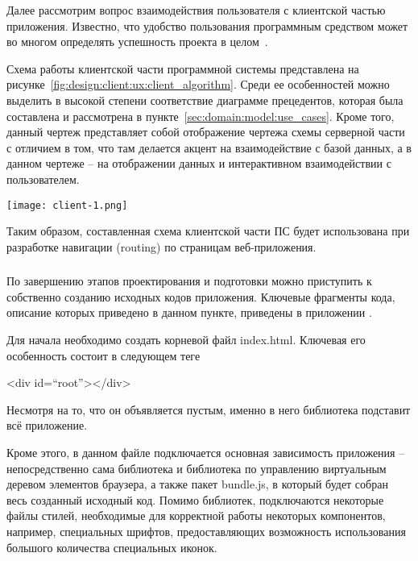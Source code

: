 Далее рассмотрим вопрос взаимодействия пользователя с клиентской частью приложения. Известно, что удобство пользования программным средством может во многом определять успешность проекта в целом~\cite[с.~44]{code_complete}.

Схема работы клиентской части программной системы представлена на рисунке~\ref{fig:design:client:ux:client_algorithm}. Среди ее особенностей можно выделить в высокой степени соответствие диаграмме прецедентов, которая была составлена и рассмотрена в пункте~\ref{sec:domain:model:use_cases}. Кроме того, данный чертеж представляет собой отображение чертежа схемы серверной части с отличием в том, что там делается акцент на взаимодействие с базой данных, а в данном чертеже -- на отображении данных и интерактивном взаимодействии с пользователем. 

\begin{sidewaysfigure}
\centering
	\texttt{[image: client-1.png]}
	\caption{Схема программы клиентской части программного средства}
	\label{fig:design:client:ux:client_algorithm}
\end{sidewaysfigure}

Таким образом, составленная схема клиентской части ПС будет использована при разработке навигации (routing) по страницам веб-приложе\-ния.

\subsubsection{}
\label{sec:design:client:development}

По завершению этапов проектирования и подготовки можно приступить к собственно созданию исходных кодов приложения. Ключевые фрагменты кода, описание которых приведено в данном пункте, приведены в приложении \sourcecodeappendix.

Для начала необходимо создать корневой файл index.html. Ключевая его особенность состоит в следующем теге
\begin{flushleft}
\qquad\qquad\qquad\qquad\qquad <div id=``root''></div>
\end{flushleft}

Несмотря на то, что он объявляется пустым, именно в него библиотека \react подставит всё приложение.

Кроме этого, в данном файле подключается основная зависимость приложения -- непосредственно сама библиотека \react и библиотека по управлению виртуальным деревом элементов браузера, а также пакет bun\-dle.js, в который будет собран весь созданный исходный код. Помимо библиотек, подключаются некоторые файлы стилей, необходимые для корректной работы некоторых компонентов, например, специальных шрифтов, предоставляющих возможность использования большого количества специальных иконок.

